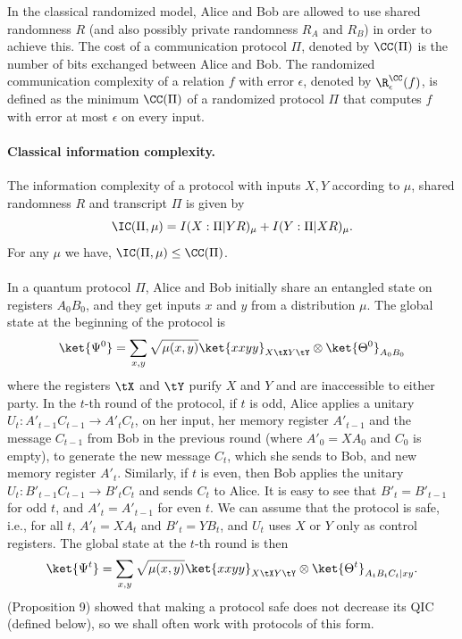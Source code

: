 In the classical randomized model, Alice and Bob are allowed to use shared randomness $R$ (and also possibly private randomness $R_A$ and $R_B$) in order to achieve this. The cost of a communication protocol $\Pi$, denoted by $\CC(\Pi)$ is the number of bits exchanged between Alice and Bob. The randomized communication complexity of a relation $f$ with error $\epsilon$, denoted by $\R^\CC_\epsilon(f)$, is defined as the minimum $\CC(\Pi)$ of a randomized protocol $\Pi$ that computes $f$ with error at most $\epsilon$ on every input.

\paragraph{Classical information complexity.} The information complexity of a protocol with inputs $X,Y$ according to $\mu$, shared randomness $R$ and transcript $\Pi$ is given by
\[ \IC(\Pi,\mu) = I(X:\Pi|YR)_\mu + I(Y:\Pi|XR)_\mu.\]
For any $\mu$ we have, $\IC(\Pi,\mu) \leq \CC(\Pi)$.

\paragraph{} In a quantum protocol $\Pi$, Alice and Bob initially share an entangled state on registers $A_0B_0$, and they get inputs $x$ and $y$ from a distribution $\mu$. The global state at the beginning of the protocol is
\[ \ket{\Psi^0} = \sum_{x,y}\sqrt{\mu(x,y)}\ket{xxyy}_{X\tX Y\tY}\otimes\ket{\Theta^0}_{A_0B_0}\]
where the registers $\tX$ and $\tY$ purify $X$ and $Y$ and are inaccessible to either party. In the $t$-th round of the protocol, if $t$ is odd, Alice applies a unitary $U_t: A'_{t-1}C_{t-1} \to A'_tC_t$, on her input, her memory register $A'_{t-1}$ and the message $C_{t-1}$ from Bob in the previous round (where $A'_0=XA_0$ and $C_0$ is empty), to generate the new message $C_t$, which she sends to Bob, and new memory register $A'_t$. Similarly, if $t$ is even, then Bob applies the unitary $U_t: B'_{t-1}C_{t-1} \to B'_tC_t$ and sends $C_t$ to Alice. It is easy to see that $B'_t=B'_{t-1}$ for odd $t$, and $A'_t=A'_{t-1}$ for even $t$. We can assume that the protocol is safe, i.e., for all $t$, $A'_t=XA_t$ and $B'_t = YB_t$, and $U_t$ uses $X$ or $Y$ only as control registers. The global state at the $t$-th round is then
\[ \ket{\Psi^t} = \sum_{x,y}\sqrt{\mu(x,y)}\ket{xxyy}_{X\tX Y\tY}\otimes\ket{\Theta^t}_{A_tB_tC_t|xy}.\]
\cite{LT17} (Proposition 9) showed that making a protocol safe does not decrease its QIC (defined below), so we shall often work with protocols of this form.

